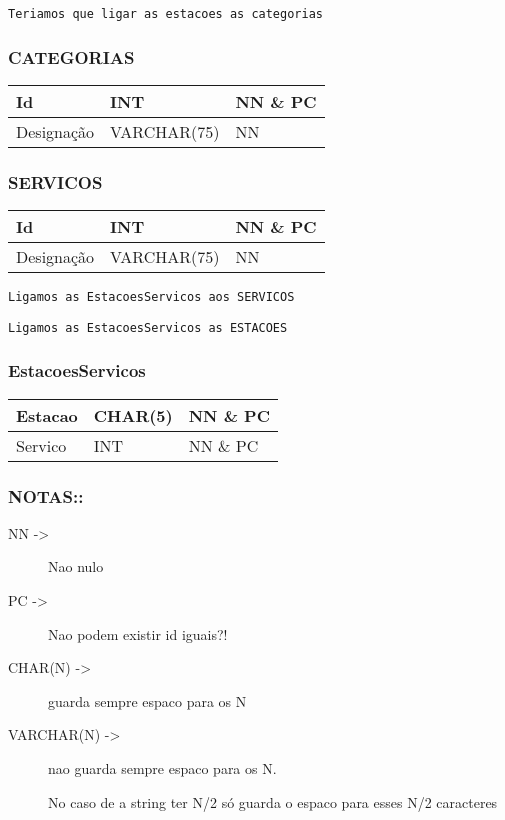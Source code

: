 \documentclass[11pt]{article}
\begin{document}
\texttt{Teriamos que ligar as estacoes as categorias}


\subsubsection{CATEGORIAS}
\label{sec:org97d05f2}
\begin{center}
\begin{tabular}{lll}
\hline
Id & INT & NN \& PC\\
\hline
Designação & VARCHAR(75) & NN\\
\hline
\end{tabular}
\end{center}


\subsubsection{SERVICOS}
\label{sec:org50641cc}
\begin{center}
\begin{tabular}{lll}
\hline
Id & INT & NN \& PC\\
\hline
Designação & VARCHAR(75) & NN\\
\hline
\end{tabular}
\end{center}


\texttt{Ligamos as EstacoesServicos aos SERVICOS}

\texttt{Ligamos as EstacoesServicos as ESTACOES}


\subsubsection{EstacoesServicos}
\label{sec:org9ff61d2}
\begin{center}
\begin{tabular}{lll}
\hline
Estacao & CHAR(5) & NN \& PC\\
\hline
Servico & INT & NN \& PC\\
\hline
\end{tabular}
\end{center}


\subsubsection{NOTAS::}
\label{sec:org09de3e4}
\begin{description}
\item[{NN ->}] Nao nulo
\item[{PC ->}] Nao podem existir id iguais?!

\item[{CHAR(N) ->}] guarda sempre espaco para os N
\item[{VARCHAR(N) ->}] nao guarda sempre espaco para os N.

No caso de a string ter N/2 só guarda o espaco para esses N/2 caracteres
\end{description}
\end{document}
